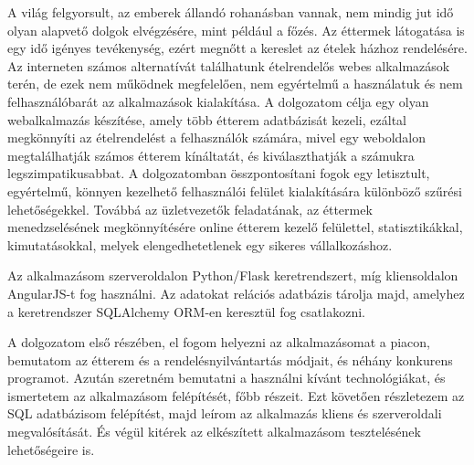 
A világ felgyorsult, az emberek állandó rohanásban vannak, nem mindig jut idő olyan alapvető dolgok elvégzésére, mint például a főzés. Az éttermek látogatása is egy idő igényes tevékenység, ezért megnőtt a kereslet az ételek házhoz rendelésére. Az interneten számos alternatívát találhatunk ételrendelős webes alkalmazások terén, de ezek nem működnek megfelelően, nem egyértelmű a használatuk és nem felhasználóbarát az alkalmazások kialakítása. A dolgozatom célja egy olyan webalkalmazás készítése, amely több étterem adatbázisát kezeli, ezáltal megkönnyíti az ételrendelést a felhasználók számára, mivel egy weboldalon megtalálhatják számos étterem kínáltatát, és kiválaszthatják a számukra legszimpatikusabbat. A dolgozatomban összpontosítani fogok egy letisztult, egyértelmű, könnyen kezelhető felhasználói felület kialakítására különböző szűrési lehetőségekkel. Továbbá az üzletvezetők feladatának, az éttermek menedzselésének megkönnyítésére online étterem kezelő felülettel, statisztikákkal, kimutatásokkal, melyek elengedhetetlenek egy sikeres vállalkozáshoz.

Az alkalmazásom szerveroldalon Python/Flask keretrendszert, míg kliensoldalon AngularJS-t fog használni. Az adatokat relációs adatbázis tárolja majd, amelyhez a keretrendszer SQLAlchemy ORM-en keresztül fog csatlakozni.

A dolgozatom első részében, el fogom helyezni az alkalmazásomat a piacon, bemutatom az étterem és a rendelésnyilvántartás módjait, és néhány konkurens programot. Azután szeretném bemutatni a használni kívánt technológiákat, és ismertetem az alkalmazásom felépítését, főbb részeit. Ezt követően részletezem az SQL adatbázisom felépítést, majd leírom az alkalmazás kliens és szerveroldali megvalósítását. És végül kitérek az elkészített alkalmazásom tesztelésének lehetőségeire is.
